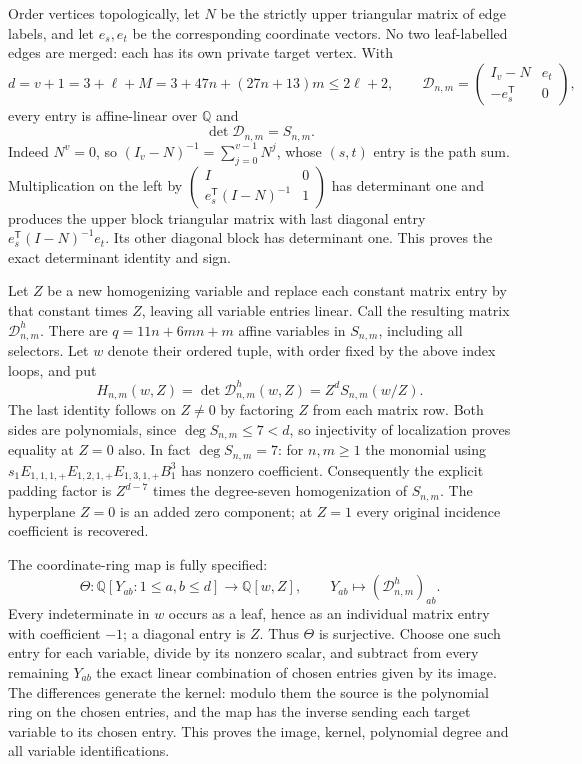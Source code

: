 Order vertices topologically, let $N$ be the strictly upper triangular
matrix of edge labels, and let $e_s,e_t$ be the corresponding coordinate
vectors. No two leaf-labelled edges are merged: each has its own
private target vertex. With
\[
 d=v+1=3+\ell+M=3+47n+(27n+13)m\le2\ell+2,\qquad
 \mathcal D_{n,m}=
 \begin{pmatrix}I_v-N&e_t\\-e_s^{\mathsf T}&0\end{pmatrix},
\]
every entry is affine-linear over $\mathbb Q$ and
\[
 \det\mathcal D_{n,m}=S_{n,m}.
\]
Indeed $N^v=0$, so $(I_v-N)^{-1}=\sum_{j=0}^{v-1}N^j$,
whose $(s,t)$ entry is the path sum. Multiplication on the left by
$\left(\begin{smallmatrix}I&0\\e_s^{\mathsf T}(I-N)^{-1}&1
\end{smallmatrix}\right)$ has determinant one and produces the
upper block triangular matrix with last diagonal entry
$e_s^{\mathsf T}(I-N)^{-1}e_t$. Its other diagonal block has
determinant one. This proves the exact determinant identity and sign.

Let $Z$ be a new homogenizing variable and replace each constant
matrix entry by that constant times $Z$, leaving all variable entries
linear. Call the resulting matrix $\mathcal D^h_{n,m}$.
There are $q=11n+6mn+m$ affine variables in $S_{n,m}$, including
all selectors. Let $w$ denote their ordered tuple, with order fixed
by the above index loops, and put
\[
 H_{n,m}(w,Z)=\det\mathcal D^h_{n,m}(w,Z)
             =Z^dS_{n,m}(w/Z).
\]
The last identity follows on $Z\ne0$ by factoring $Z$ from each
matrix row. Both sides are polynomials, since $\deg S_{n,m}\le7<d$,
so injectivity of localization proves equality at $Z=0$ also.
In fact $\deg S_{n,m}=7$: for $n,m\ge1$ the monomial using
$s_1E_{1,1,1,+}E_{1,2,1,+}E_{1,3,1,+}B_1^3$ has nonzero
coefficient. Consequently the explicit padding factor is
$Z^{d-7}$ times the degree-seven homogenization of $S_{n,m}$.
The hyperplane $Z=0$ is an added zero component; at $Z=1$ every
original incidence coefficient is recovered.

The coordinate-ring map is fully specified:
\[
 \Theta:\mathbb Q[Y_{ab}:1\le a,b\le d]\longrightarrow
 \mathbb Q[w,Z],\qquad Y_{ab}\longmapsto
    (\mathcal D^h_{n,m})_{ab}.
\]
Every indeterminate in $w$ occurs as a leaf, hence as an individual
matrix entry with coefficient $-1$; a diagonal entry is $Z$.
Thus $\Theta$ is surjective. Choose one such entry for each variable,
divide by its nonzero scalar, and subtract from every remaining
$Y_{ab}$ the exact linear combination of chosen entries given by its
image. The differences generate the kernel: modulo them the source
is the polynomial ring on the chosen entries, and the map has the
inverse sending each target variable to its chosen entry. This proves
the image, kernel, polynomial degree and all variable identifications.

